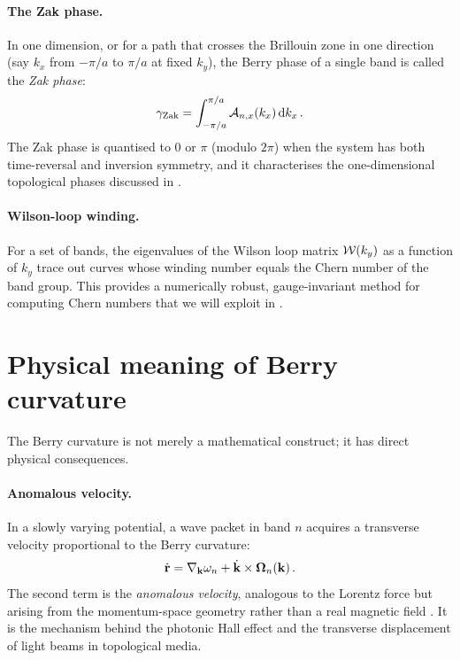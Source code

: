 \paragraph{The Zak phase.}
In one dimension, or for a path that crosses the Brillouin zone in one
direction (say $k_x$ from $-\pi/a$ to $\pi/a$ at fixed $k_y$), the
Berry phase of a single band is called the \emph{Zak phase}:
\begin{equation}\label{eq:ch5-zak}
  \gamma_{\mathrm{Zak}} = \int_{-\pi/a}^{\pi/a}\mathcal{A}_{n,x}(k_x)\,\mathrm{d} k_x\,.
\end{equation}
The Zak phase is quantised to $0$ or $\pi$ (modulo $2\pi$) when the
system has both time-reversal and inversion symmetry, and it
characterises the one-dimensional topological phases discussed in
.

\paragraph{Wilson-loop winding.}
For a set of bands, the eigenvalues of the Wilson loop matrix
$\mathcal{W}(k_y)$ as a function of $k_y$ trace out curves whose winding
number equals the Chern number of the band group.  This provides a
numerically robust, gauge-invariant method for computing Chern numbers
that we will exploit in .

\section{Physical meaning of Berry curvature}
\label{sec:ch5-physical}

The Berry curvature is not merely a mathematical construct; it has
direct physical consequences.

\paragraph{Anomalous velocity.}
In a slowly varying potential, a wave packet in band $n$ acquires a
transverse velocity proportional to the Berry curvature:
\begin{equation}\label{eq:ch5-anomalous}
  \dot{\mathbf{r}} = \nabla_{\mathbf{k}}\omega_n
  + \dot{\mathbf{k}}\times\boldsymbol{\Omega}_n(\mathbf{k})\,.
\end{equation}
The second term is the \emph{anomalous velocity}, analogous to the
Lorentz force but arising from the momentum-space geometry rather than
a real magnetic field
\cite{kane2005sub}.  It is the mechanism behind the photonic Hall
effect and the transverse displacement of light beams in
topological media.


